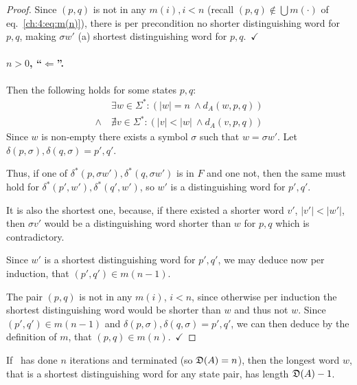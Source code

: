 \begin{proof}
Since $(p,q)$ is not in any $m(i), i<n$ (recall $(p,q) \notin \bigcup{m(\cdot)}$ of eq.~\ref{ch:4:eq:m(n)}), there is per precondition no shorter distinguishing word for $p,q$, making $\sigma w'$ (a) shortest distinguishing word for $p,q$.\ $\checkmark$ 

\paragraph*{$n > 0$, ``$\Leftarrow$''.} 
Then the following holds for some states $p,q$:
\begin{align*}
&\exists w\in\Sigma^*\colon (|w| = n\ \land d_A(w, p, q))\\
\land\ &\nexists v\in\Sigma^*\colon (|v| < |w|\ \land d_A(v, p, q))
\end{align*}
Since $w$ is non-empty there exists a symbol $\sigma$ such that $w = \sigma w'$. Let $\delta(p,\sigma),\delta(q,\sigma) = p',q'$.

Thus, if one of $\delta^*(p, \sigma w'),\delta^*(q, \sigma w')$ is in $F$ and one not, then the same must hold for $\delta^*(p', w'),\delta^*(q', w')$, so $w'$ is a distinguishing word for $p',q'$.

It is also the shortest one, because, if there existed a shorter word $v'$, $|v'| < |w'|$, then $\sigma v'$ would be a distinguishing word shorter than $w$ for $p,q$ which is contradictory.

Since $w'$ is a shortest distinguishing word for $p',q'$, we may deduce now per induction, that $(p',q')\in m(n-1)$.

The pair $(p,q)$ is not in any $m(i)$, $i<n$, since otherwise per induction the shortest distinguishing word would be shorter than $w$ and thus not $w$. Since $(p',q')\in m(n-1)$ and $\delta(p,\sigma),\delta(q,\sigma) = p',q'$, we can then deduce by the definition of $m$, that $(p,q)\in m(n)$.\ $\checkmark$ 
\end{proof}

\begin{lemma}\label{ch:4:semantics-of-D(A)}
    If \CompDist\ has done $n$ iterations and terminated (so $\mathfrak{D}(A) = n$), then the longest word $w$, that is a shortest distinguishing word for any state pair, has length $\mathfrak{D}(A)-1$.
\end{lemma}

